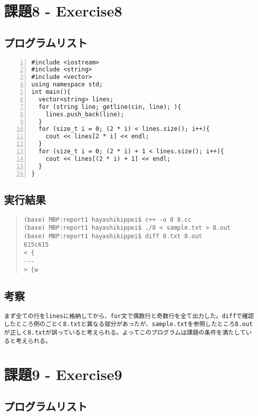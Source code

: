 \documentclass[11pt,a4paper]{jsarticle}
\begin{document}
%
\section{課題8 - Exercise8}
\subsection{プログラムリスト}
\label{sec:prog-list2}

\begin{lstlisting}[numbers=left,numberstyle=\ttfamily,xleftmargin=2zw]
#include <iostream>
#include <string>
#include <vector>
using namespace std;
int main(){
  vector<string> lines;
  for (string line; getline(cin, line); ){
    lines.push_back(line);
  }
  for (size_t i = 0; (2 * i) < lines.size(); i++){
    cout << lines[2 * i] << endl;
  }
  for (size_t i = 0; (2 * i) + 1 < lines.size(); i++){
    cout << lines[(2 * i) + 1] << endl;
  }
}

\end{lstlisting}
%
\subsection{実行結果}
\begin{quote}           %
\begin{verbatim}
(base) MBP:report1 hayashikippei$ c++ -o 8 8.cc
(base) MBP:report1 hayashikippei$ ./8 < sample.txt > 8.out
(base) MBP:report1 hayashikippei$ diff 8.txt 8.out
615c615
< {
---
> {w
\end{verbatim}
\end{quote}
%
\subsection{考察}
\begin{verbatim}
まず全ての行をlinesに格納してから、for文で偶数行と奇数行を全て出力した。diffで確認したところ例のごとく8.txtと異なる部分があったが、sample.txtを参照したところ8.outが正しく8.txtが誤っていると考えられる。よってこのプログラムは課題の条件を満たしていると考えられる。
\end{verbatim}
%
\section{課題9 - Exercise9}
\subsection{プログラムリスト}
\label{sec:prog-list2}
\end{document}
